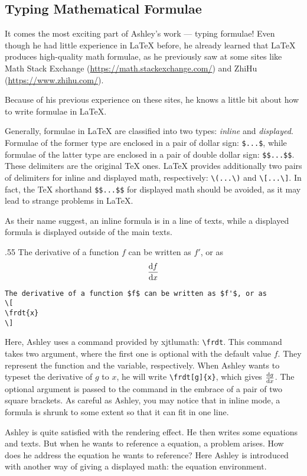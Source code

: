 \subsection{Typing Mathematical Formulae}
It comes the most exciting part of Ashley's work --- typing formulae! Even though he had little experience in \LaTeX{} before, he already learned that \LaTeX{} produces high-quality math formulae, as he previously saw at some sites like Math Stack Exchange (\url{https://math.stackexchange.com/}) and ZhiHu (\url{https://www.zhihu.com/}).

Because of his previous experience on these sites, he knows a little bit about how to write formulae in \LaTeX{}.

Generally, formulae in \LaTeX{} are classified into two types: \emph{inline} and \emph{displayed}. Formulae of the former type are enclosed in a pair of dollar sign: \verb=$...$=, while formulae of the latter type are enclosed in a pair of double dollar sign: \verb=$$...$$=. These delimiters are the original \TeX{} ones. \LaTeX{} provides additionally two pairs of delimiters for inline and displayed math, respectively: \verb=\(...\)= and \verb=\[...\]=. In fact, the \TeX{} shorthand \verb=$$...$$= for displayed math should be avoided, as it may lead to strange problems in \LaTeX{}.

As their name suggest, an inline formula is in a line of texts, while a displayed formula is displayed outside of the main texts.

\begin{miniexammar}{.55\textandmarginlen}%
{
The derivative of a function $f$ can be written as $f'$, or as
\[
\frdt{x}
\]
}
\begin{lstlisting}
The derivative of a function $f$ can be written as $f'$, or as
\[
\frdt{x}
\]
\end{lstlisting}
\end{miniexammar}
Here, Ashley uses a command provided by xjtlumath: \verb=\frdt=. This command takes two argument, where the first one is optional with the default value $f$. They represent the function and the variable, respectively. When Ashley wants to typeset the derivative of $g$ to $x$, he will write 
\verb=\frdt[g]{x}=, which gives $\frdt[g]{x}$. The optional argument is passed to the command in the embrace of a pair of two square brackets. As careful as Ashley, you may notice that in inline mode, a formula is shrunk to some extent so that it can fit in one line.

Ashley is quite satisfied with the rendering effect. He then writes some equations and texts. But when he wants to reference a equation, a problem arises. How does he address the equation he wants to reference? Here Ashley is introduced with another way of giving a displayed math: the equation environment.

